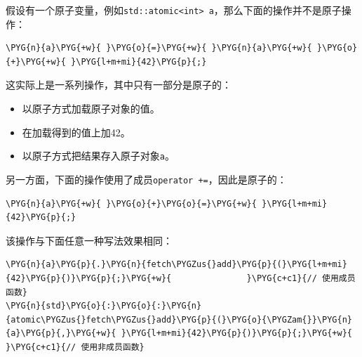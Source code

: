 假设有一个原子变量，例如\texttt{std::\allowbreak{}atomic<\allowbreak{}int> a}，那么下面的操作并不是原子操作：



\begin{codeblockbg}
\begin{Verbatim}[commandchars=\\\{\},breaklines=true,breakanywhere=true,fontsize=\codefont,xleftmargin=17bp]
\PYG{n}{a}\PYG{+w}{ }\PYG{o}{=}\PYG{+w}{ }\PYG{n}{a}\PYG{+w}{ }\PYG{o}{+}\PYG{+w}{ }\PYG{l+m+mi}{42}\PYG{p}{;}
\end{Verbatim}
\end{codeblockbg}



这实际上是一系列操作，其中只有一部分是原子的：



\begin{itemize}
\item 以原子方式加载原子对象的值。



\item 在加载得到的值上加42。



\item 以原子方式把结果存入原子对象\texttt{a}。

\end{itemize}



另一方面，下面的操作使用了成员\texttt{operator +=}，因此是原子的：



\begin{codeblockbg}
\begin{Verbatim}[commandchars=\\\{\},breaklines=true,breakanywhere=true,fontsize=\codefont,xleftmargin=17bp]
\PYG{n}{a}\PYG{+w}{ }\PYG{o}{+}\PYG{o}{=}\PYG{+w}{ }\PYG{l+m+mi}{42}\PYG{p}{;}
\end{Verbatim}
\end{codeblockbg}



该操作与下面任意一种写法效果相同：



\begin{codeblockbg}
\begin{Verbatim}[commandchars=\\\{\},breaklines=true,breakanywhere=true,fontsize=\codefont,xleftmargin=17bp]
\PYG{n}{a}\PYG{p}{.}\PYG{n}{fetch\PYGZus{}add}\PYG{p}{(}\PYG{l+m+mi}{42}\PYG{p}{)}\PYG{p}{;}\PYG{+w}{               }\PYG{c+c1}{// 使用成员函数}
\PYG{n}{std}\PYG{o}{:}\PYG{o}{:}\PYG{n}{atomic\PYGZus{}fetch\PYGZus{}add}\PYG{p}{(}\PYG{o}{\PYGZam{}}\PYG{n}{a}\PYG{p}{,}\PYG{+w}{ }\PYG{l+m+mi}{42}\PYG{p}{)}\PYG{p}{;}\PYG{+w}{ }\PYG{c+c1}{// 使用非成员函数}
\end{Verbatim}
\end{codeblockbg}


